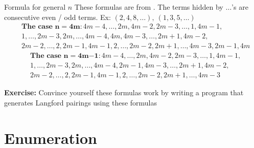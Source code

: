\documentclass[aspectratio=169, handout]{beamer}
\begin{document}
\begin{frame}{Formula for general $n$}
    These formulas are from \cite{Langford4m}. The terms hidden by $\ldots$'s are consecutive even / odd terms. Ex: $(2, 4, 8, \ldots),~ (1, 3, 5, \ldots)$ \pause
    \begin{equation*}
    \begin{split}
        & \textbf{The case }{\boldsymbol n \boldsymbol = \boldsymbol 4 \boldsymbol m \boldsymbol \colon } 4m - 4, \ldots, 2m, 4m - 2, 2m - 3, \ldots, 1, 4m - 1, \\
        & 1, \ldots, 2m - 3, 2m, \ldots, 4m - 4, 4m, 4m - 3, \ldots, 2m + 1, 4m - 2, \\
        & 2m - 2, \ldots, 2, 2m - 1, 4m - 1, 2, \ldots, 2m - 2, 2m + 1, \ldots, 4m - 3, 2m - 1, 4m
    \end{split}    
    \end{equation*} \pause
    \begin{equation*}
    \begin{split}
        & \textbf{The case }{\boldsymbol n \boldsymbol = \boldsymbol 4 \boldsymbol m \boldsymbol - \boldsymbol 1 \boldsymbol \colon } 4m - 4, \ldots, 2m, 4m - 2, 2m - 3, \ldots, 1, 4m - 1, \\
        & 1, \ldots, 2m - 3, 2m, \ldots, 4m - 4, 2m - 1, 4m - 3, \ldots, 2m + 1, 4m - 2, \\
        & 2m - 2, \ldots, 2, 2m - 1, 4m - 1, 2, \ldots, 2m - 2, 2m + 1, \ldots, 4m - 3
    \end{split}
    \end{equation*} \pause
    
    \textcolor{sigma@alertred}{\textbf{Exercise:}} Convince yourself these formulas work by writing a program that generates Langford pairings using these formulas
\end{frame}

\section{Enumeration}
\frame{\sectionpage}
\end{document}
